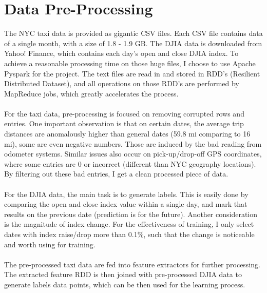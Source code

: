 \documentclass[a4paper]{article}
\begin{document}
\section{Data Pre-Processing}
The NYC taxi data is provided as gigantic CSV files. Each CSV file contains data of a single month, with a size of 1.8 - 1.9 GB. The DJIA data is downloaded from Yahoo! Finance, which contains each day's  open and close DJIA index. To achieve a reasonable processing time on those huge files, I choose to use Apache Pyspark for the project. The text files are read in and stored in RDD's (Resilient Distributed Dataset), and all operations on those RDD's are performed by MapReduce jobs, which greatly accelerates the process.\\ \\
For the taxi data, pre-processing is focused on removing corrupted rows and entries. One important observation is that on certain dates, the average trip distances are anomalously higher than general dates (59.8 mi comparing to 16 mi), some are even negative numbers. Those are induced by the bad reading from odometer systems. Similar issues also occur on pick-up/drop-off GPS coordinates, where some entries are 0 or incorrect (different than NYC geography locations). By filtering out these bad entries, I get a clean processed piece of data.\\ \\
For the DJIA data, the main task is to generate labels. This is easily done by comparing the open and close index value within a single day, and mark that results on the previous date (prediction is for the future). Another consideration is the magnitude of index change. For the effectiveness of training, I only select dates with index raise/drop more than 0.1\%, such that the change is noticeable and worth using for training.\\\\
The pre-processed taxi data are fed into feature extractors for further 
processing. The extracted feature RDD is then joined with pre-processed DJIA data to generate labels data points, which can be then used for the learning process. 
\end{document}
